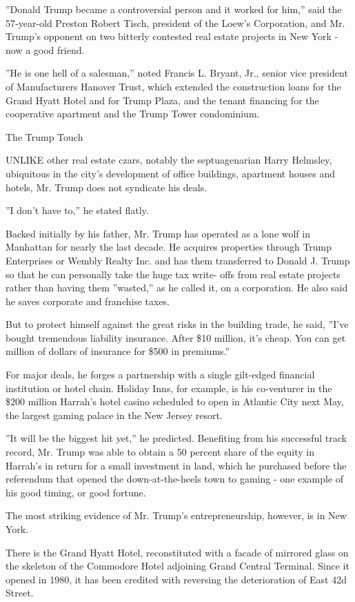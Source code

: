 ''Donald Trump became a controversial person and it worked for him,''
said the 57-year-old Preston Robert Tisch, president of the Loew's
Corporation, and Mr. Trump's opponent on two bitterly contested real
estate projects in New York - now a good friend.

''He is one hell of a salesman,'' noted Francis L. Bryant, Jr., senior
vice president of Manufacturers Hanover Trust, which extended the
construction loans for the Grand Hyatt Hotel and for Trump Plaza, and
the tenant financing for the cooperative apartment and the Trump Tower
condominium.

The Trump Touch

UNLIKE other real estate czars, notably the septuagenarian Harry
Helmsley, ubiquitous in the city's development of office buildings,
apartment houses and hotels, Mr. Trump does not syndicate his deals.

''I don't have to,'' he stated flatly.

Backed initially by his father, Mr. Trump has operated as a lone wolf in
Manhattan for nearly the last decade. He acquires properties through
Trump Enterprises or Wembly Realty Inc. and has them transferred to
Donald J. Trump so that he can personally take the huge tax write- offs
from real estate projects rather than having them ''wasted,'' as he
called it, on a corporation. He also said he saves corporate and
franchise taxes.

But to protect himself against the great risks in the building trade, he
said, ''I've bought tremendous liability insurance. After \$10 million,
it's cheap. You can get million of dollars of insurance for \$500 in
premiums.''

For major deals, he forges a partnership with a single gilt-edged
financial institution or hotel chain. Holiday Inns, for example, is his
co-venturer in the \$200 million Harrah's hotel casino scheduled to open
in Atlantic City next May, the largest gaming palace in the New Jersey
resort.

''It will be the biggest hit yet,'' he predicted. Benefiting from his
successful track record, Mr. Trump was able to obtain a 50 percent share
of the equity in Harrah's in return for a small investment in land,
which he purchased before the referendum that opened the
down-at-the-heels town to gaming - one example of his good timing, or
good fortune.

The most striking evidence of Mr. Trump's entrepreneurship, however, is
in New York.

There is the Grand Hyatt Hotel, reconstituted with a facade of mirrored
glass on the skeleton of the Commodore Hotel adjoining Grand Central
Terminal. Since it opened in 1980, it has been credited with reversing
the deterioration of East 42d Street.

